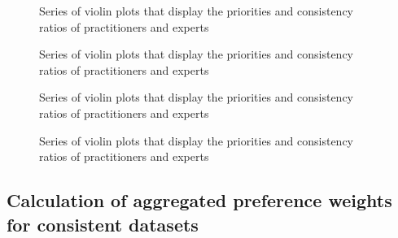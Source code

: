 \documentclass [oneside,10pt,a4paper,ngerman,BCOR10mm,headsepline,parindent,final]{scrartcl}
\begin{document}
    \begin{figure}
        \begin{center}\end{center}
        \caption{Series of violin plots that display the priorities and consistency ratios of practitioners and experts}
        \label{fig:violins_all_attributes}
    \end{figure}
    
    \begin{figure}
        \begin{center}\end{center}
        \caption{Series of violin plots that display the priorities and consistency ratios of practitioners and experts}
        \label{fig:violins_all_attributes}
    \end{figure}
    
    \begin{figure}
        \begin{center}\end{center}
        \caption{Series of violin plots that display the priorities and consistency ratios of practitioners and experts}
        \label{fig:violins_all_attributes}
    \end{figure}
    
    \begin{figure}
        \begin{center}\end{center}
        \caption{Series of violin plots that display the priorities and consistency ratios of practitioners and experts}
        \label{fig:violins_all_attributes}
    \end{figure}
    
    \hypertarget{calculation-of-aggregated-preference-weights-for-consistent-datasets}{%
\subsection{Calculation of aggregated preference weights for consistent
datasets}\label{calculation-of-aggregated-preference-weights-for-consistent-datasets}}
\end{document}
